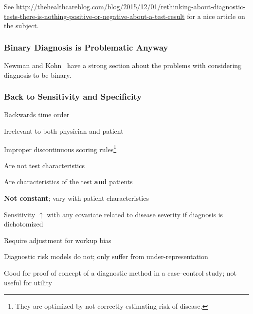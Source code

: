 See
\url{http://thehealthcareblog.com/blog/2015/12/01/rethinking-about-diagnostic-tests-there-is-nothing-positive-or-negative-about-a-test-result}
for a nice article on the subject.

\subsubsection{Binary Diagnosis is Problematic Anyway}

Newman and Kohn~\cite{new09evi} have a strong section about the problems with considering diagnosis to be binary.

\subsubsection{Back to Sensitivity and Specificity}
\bi
\item Backwards time order
\item Irrelevant to both physician and patient
\item Improper discontinuous scoring rules\footnote{They are optimized
    by not correctly estimating risk of disease.}
\item Are not test characteristics
 \bi
 \item Are characteristics of the test \textbf{and} patients
 \ei
\item \textbf{Not constant}; vary with patient characteristics
 \bi
 \item Sensitivity $\uparrow$ with any covariate related to disease
 severity if diagnosis is dichotomized
 \ei
\item Require adjustment for workup bias
 \bi
 \item Diagnostic risk models do not; only suffer from under-representation
 \ei
\item Good for proof of concept of a diagnostic method in a
 case--control study; not useful for utility
\ei

